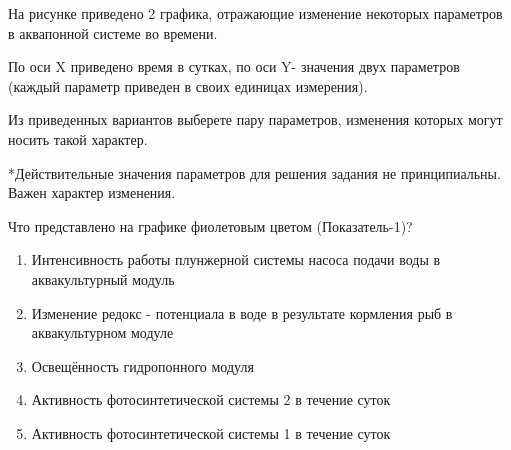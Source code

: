 
На рисунке приведено 2 графика, отражающие изменение некоторых параметров в аквапонной системе во времени.

По оси X приведено время в сутках, по оси Y- значения двух параметров (каждый параметр приведен в своих единицах измерения). 

Из приведенных вариантов выберете пару параметров, изменения которых могут носить такой характер.


*Действительные значения параметров для решения задания не принципиальны. Важен характер изменения.

Что представлено на графике фиолетовым цветом (Показатель-1)?

\begin{enumerate}
    \item Интенсивность работы плунжерной системы насоса подачи воды в аквакультурный модуль
    \item Изменение редокс - потенциала в воде в результате кормления рыб в аквакультурном модуле
    \item Освещённость гидропонного модуля
    \item Активность фотосинтетической системы 2 в течение суток
    \item Активность фотосинтетической системы 1 в течение суток
\end{enumerate}